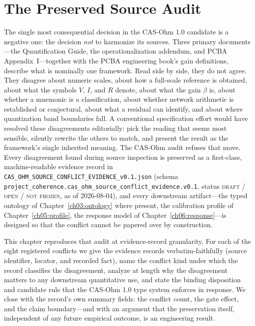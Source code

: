 \chapter{The Preserved Source Audit}\label{ch04:audit}

The single most consequential decision in the CAS-Ohm 1.0 candidate is a
negative one: the decision \emph{not} to harmonize its sources. Three primary
documents---the Quantification Guide, the operationalization addendum, and
PCBA Appendix~I---together with the PCBA engineering book's gain definitions,
describe what is nominally one framework. Read side by side, they do not
agree. They disagree about numeric scales, about how a full-scale reference is
obtained, about what the symbols $V$, $I$, and $R$ denote, about what the gain
$\beta$ is, about whether a mnemonic is a classification, about whether
network arithmetic is established or conjectural, about what a residual can
identify, and about where quantization band boundaries fall. A conventional
specification effort would have resolved these disagreements editorially:
pick the reading that seems most sensible, silently rewrite the others to
match, and present the result as the framework's single inherited meaning.
The CAS-Ohm audit refuses that move. Every disagreement found during source
inspection is preserved as a first-class, machine-readable evidence record in
\texttt{CAS\_OHM\_SOURCE\_CONFLICT\_EVIDENCE\_v0.1.json}
(schema \texttt{project\_coherence.cas\_ohm\_source\_conflict\_evidence.v0.1},
status \textsc{draft / open / not frozen}, as of 2026-08-04), and every
downstream artifact---the typed ontology of
Chapter~\ref{ch03:ontology} where present, the calibration profile of
Chapter~\ref{ch05:profile}, the response model of
Chapter~\ref{ch06:response}---is designed so that the conflict cannot be
papered over by construction.

This chapter reproduces that audit at evidence-record granularity. For each
of the eight registered conflicts we give the evidence records
verbatim-faithfully (source identifier, locator, and recorded fact), name the
conflict kind under which the record classifies the disagreement, analyze at
length why the disagreement matters to any downstream quantitative use, and
state the binding disposition and candidate rule that the CAS-Ohm 1.0 type
system enforces in response. We close with the record's own summary fields:
the conflict count, the gate effect, and the claim boundary---and with an
argument that the preservation itself, independent of any future empirical
outcome, is an engineering result.


